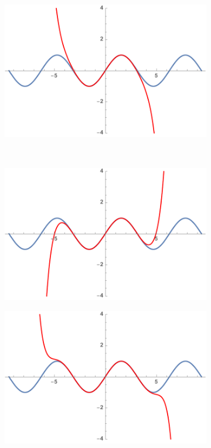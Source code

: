 \begin{figure}[h]
\begin{subfigure}[t]{0.24\textwidth}
	\end{subfigure}
	\begin{subfigure}[t]{0.24\textwidth}
		\centering
		\includegraphics[width=\textwidth]{./Images/Ch03/sinP7.pdf}
	\end{subfigure}\\
	\begin{subfigure}[t]{0.24\textwidth}
		\centering
		\includegraphics[width=\textwidth]{./Images/Ch03/sinP9.pdf}
	\end{subfigure}
	\begin{subfigure}[t]{0.24\textwidth}
		\centering
		\includegraphics[width=\textwidth]{./Images/Ch03/sinP11.pdf}

\end{subfigure}
\end{figure}
